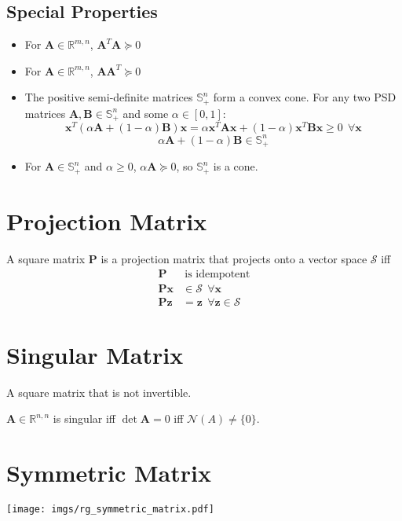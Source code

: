 \documentclass{book}
\newcommand{\mA}{\mathbf{A}}
\newcommand{\mB}{\mathbf{B}}
\newcommand{\mP}{\mathbf{P}}
\newcommand{\vx}{\mathbf{x}}
\newcommand{\vz}{\mathbf{z}}
\newcommand{\sPSD}{\mathbb{S}^n_+}
\newcommand{\sRmn}{\mathbb{R}^{m,n}}
\newcommand{\sRnn}{\mathbb{R}^{n,n}}
\newcommand{\ispsd}{\succeq}
\begin{document}
\subsection*{Special Properties}
\begin{itemize}
\item For $\mA\in\sRmn$, $\mA^T\mA\ispsd0$
\item For $\mA\in\sRmn$, $\mA\mA^T\ispsd0$
\item The positive semi-definite matrices $\sPSD$ form a convex cone. For any two PSD matrices $\mA,\mB\in\sPSD$ and some $\alpha\in[0,1]$:
\begin{equation}
\vx^T(\alpha\mA+(1-\alpha)\mB)\vx=\alpha \vx^T\mA\vx+(1-\alpha)\vx^T\mB\vx\ge0~~\forall\vx
\end{equation}
\begin{equation}
\alpha\mA+(1-\alpha)\mB\in\sPSD
\end{equation}
\item For $\mA\in\sPSD$ and $\alpha\ge0$, $\alpha\mA\ispsd0$, so $\sPSD$ is a cone.
\end{itemize}



\section{Projection Matrix}
A square matrix $\mP$ is a projection matrix that projects onto a vector space $\mathcal{S}$ iff
\begin{align}
\mP&~\textrm{is idempotent} \\
\mP\vx&\in\mathcal{S}~~\forall\vx \\
\mP\vz&=\vz~~\forall\vz\in\mathcal{S}
\end{align}





\section{Singular Matrix}
A square matrix that is not invertible.

$\mA\in\sRnn$ is singular iff $\det \mA=0$ iff $\mathcal{N}(A)\ne\{0\}$.


\section{Symmetric Matrix}

\begin{center}
\texttt{[image: imgs/rg\_symmetric\_matrix.pdf]}
\end{center}
\end{document}
